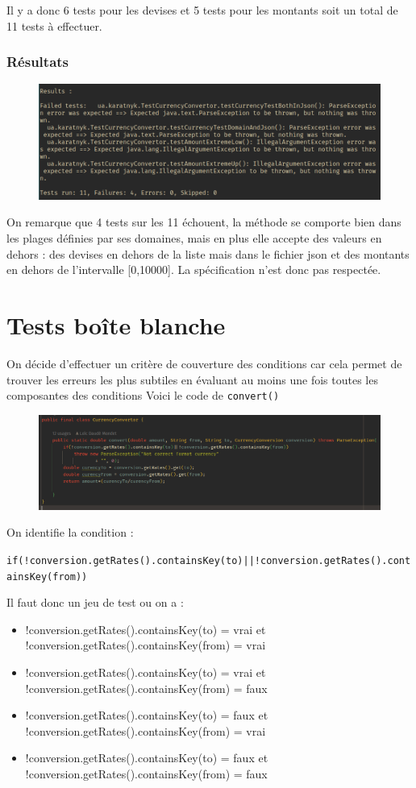 \documentclass[11pt]{rapport-tp-qlm}
\begin{document}
Il y a donc 6 tests pour les devises et 5 tests pour les montants soit un total de 11 tests à effectuer.

\subsection*{Résultats}
\begin{figure}[h]
  \includegraphics[scale=0.5]{assets/resbblanche}
  \centering
  \end{figure}

On remarque que 4 tests sur les 11 échouent, la méthode se comporte bien dans les plages définies par ses domaines, mais en plus elle accepte des valeurs en dehors : des devises en dehors de la liste mais dans le fichier json et des montants en dehors de l'intervalle [0,10000]. La spécification n'est donc pas respectée.
\newpage
\chapter{Tests boîte blanche}
On décide d'effectuer un critère de couverture des conditions car cela permet de trouver les erreurs les plus subtiles en évaluant au moins une fois toutes les composantes des conditions
Voici le code de \texttt{convert()}
\begin{figure}[h]
  \includegraphics[scale=0.5]{assets/code}
  \centering
  \end{figure}


On identifie la condition : 

\texttt{if(!conversion.getRates().containsKey(to)||!conversion.getRates().containsKey(from))}

Il faut donc un jeu de test ou on a : 
\begin{itemize}
  \item !conversion.getRates().containsKey(to) = vrai et !conversion.getRates().containsKey(from) = vrai
  \item !conversion.getRates().containsKey(to) = vrai et !conversion.getRates().containsKey(from) = faux
  \item !conversion.getRates().containsKey(to) = faux et !conversion.getRates().containsKey(from) = vrai
  \item !conversion.getRates().containsKey(to) = faux et !conversion.getRates().containsKey(from) = faux
\end{itemize}
\end{document}
